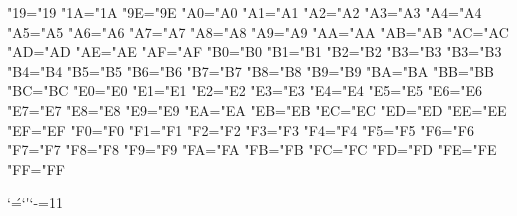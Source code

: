 \lccode"19="19 %
\lccode"1A="1A %
\lccode"9E="9E %
\lccode"A0="A0 %
\lccode"A1="A1 %
\lccode"A2="A2 %
\lccode"A3="A3 %
\lccode"A4="A4 %
\lccode"A5="A5 %
\lccode"A6="A6 %
\lccode"A7="A7 %
\lccode"A8="A8 %
\lccode"A9="A9 %
\lccode"AA="AA %
\lccode"AB="AB %
\lccode"AC="AC %
\lccode"AD="AD %
\lccode"AE="AE %
\lccode"AF="AF %
\lccode"B0="B0 %
\lccode"B1="B1 %
\lccode"B2="B2 %
\lccode"B3="B3 %
\lccode"B3="B3 %
\lccode"B4="B4 %
\lccode"B5="B5 %
\lccode"B6="B6 %
\lccode"B7="B7 %
\lccode"B8="B8 %
\lccode"B9="B9 %
\lccode"BA="BA %
\lccode"BB="BB %
\lccode"BC="BC %
\lccode"E0="E0 %
\lccode"E1="E1 %
\lccode"E2="E2 %
\lccode"E3="E3 %
\lccode"E4="E4 %
\lccode"E5="E5 %
\lccode"E6="E6 %
\lccode"E7="E7 %
\lccode"E8="E8 %
\lccode"E9="E9 %
\lccode"EA="EA %
\lccode"EB="EB %
\lccode"EC="EC %
\lccode"ED="ED %
\lccode"EE="EE %
\lccode"EF="EF %
\lccode"F0="F0 %
\lccode"F1="F1 %
\lccode"F2="F2 %
\lccode"F3="F3 %
\lccode"F4="F4 %
\lccode"F5="F5 %
\lccode"F6="F6 %
\lccode"F7="F7 %
\lccode"F8="F8 %
\lccode"F9="F9 %
\lccode"FA="FA %
\lccode"FB="FB %
\lccode"FC="FC %
\lccode"FD="FD %
\lccode"FE="FE %
\lccode"FF="FF %

\lccode`\'=`\'
\catcode`-=11

